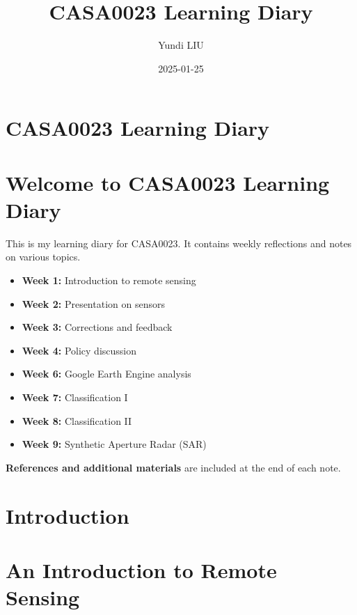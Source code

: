 \documentclass[
  letterpaper,
  DIV=11,
  numbers=noendperiod]{scrreprt}
\title{CASA0023 Learning Diary}
\author{Yundi LIU}
\date{2025-01-25}
\providecommand{\tightlist}{%
  \setlength{\itemsep}{0pt}\setlength{\parskip}{0pt}}\usepackage{longtable,booktabs,array}
\renewcommand*\contentsname{Table of contents}
\newcommand\contentsname{Table of contents}
\begin{document}
\maketitle

\renewcommand*\contentsname{Table of contents}
{
\hypersetup{linkcolor=}
\setcounter{tocdepth}{2}
\tableofcontents
}

\chapter{CASA0023 Learning Diary}\label{casa0023-learning-diary}


\chapter{Welcome to CASA0023 Learning
Diary}\label{welcome-to-casa0023-learning-diary}

This is my learning diary for CASA0023. It contains weekly reflections
and notes on various topics.

\begin{itemize}
\tightlist
\item
  \textbf{Week 1:} Introduction to remote sensing
\item
  \textbf{Week 2:} Presentation on sensors
\item
  \textbf{Week 3:} Corrections and feedback
\item
  \textbf{Week 4:} Policy discussion
\item
  \textbf{Week 6:} Google Earth Engine analysis
\item
  \textbf{Week 7:} Classification I
\item
  \textbf{Week 8:} Classification II
\item
  \textbf{Week 9:} Synthetic Aperture Radar (SAR)
\end{itemize}

\textbf{References and additional materials} are included at the end of
each note.


\chapter{Introduction}\label{introduction}


\chapter{An Introduction to Remote
Sensing}\label{an-introduction-to-remote-sensing}
\end{document}
